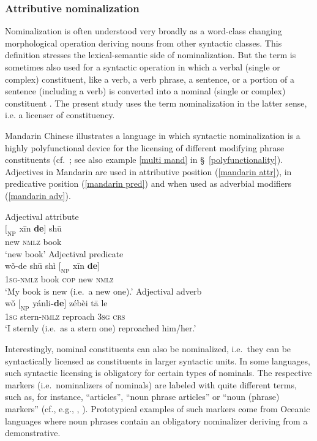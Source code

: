 \subsubsection{Attributive nominalization} \label{attr nmlz}
Nominalization is often understood very broadly as a word-class changing morphological operation deriving nouns from other syntactic classes. This definition stresses the lexical-semantic side of nominalization. But the term is sometimes also used for a syntactic operation in which a verbal (single or complex) constituent, like a verb, a verb phrase, a sentence, or a portion of a sentence (including a verb) is converted into a nominal (single or complex) constituent \citep[575]{li-etal1981}. The present study uses the term nominalization in the latter sense, i.e. a licenser of constituency.

Mandarin Chinese illustrates a language in which syntactic nominalization is a highly polyfunctional device for the licensing of different modifying phrase constituents (cf.~\citealt[575–593]{li-etal1981}; see also example \ref{multi mand} in \S~\ref{polyfunctionality}). Adjectives in Mandarin are used in attributive position (\ref{mandarin attr}), in predicative position (\ref{mandarin pred}) and when used as adverbial modifiers (\ref{mandarin adv}).%
\begin{exe}
\ex
{}
\begin{xlist}
\ex	\rm{Adjectival attribute}\\
\gll	$[_\textrm{NP}$ xīn 		\textbf{de}$]$ 	shū\\
	{} new	 	\textsc{nmlz} 	book\\
\glt	‘new book’\label{mandarin attr}
\ex	\rm{Adjectival predicate}\\
\gll	wǒ-de shū shì $[_\textrm{NP}$ xīn \textbf{de}$]$\\
	\textsc{1sg-nmlz} book \textsc{cop} {} new \textsc{nmlz}\\
\glt	‘My book is new (i.e.~a new one).’\label{mandarin pred}
\ex	\rm{Adjectival adverb}\\
\gll	wǒ $[_\textrm{NP}$ yánli\textbf{-de}$]$ zébèi tā le\\
	\textsc{1sg} {} stern\textsc{-nmlz} reproach \textsc{3sg} \textsc{crs}\\
\glt	‘I sternly (i.e.~as a stern one) reproached him/her.’ \label{mandarin adv}
\end{xlist}
\end{exe}
Interestingly, nominal constituents can also be nominalized, i.e.~they can be syntactically licensed as constituents in larger syntactic units. In some languages, such syntactic licensing is obligatory for certain types of nominals. The respective markers (i.e.~nominalizers of nominals) are labeled with quite different terms, such as, for instance, “articles”, “noun phrase articles” or “noun (phrase) markers” (cf., e.g., \citealt[152]{dryer2007}, \citealt[95, elsewhere]{rijkhoff2002}). Prototypical examples of such markers come from Oceanic languages where noun phrases contain an obligatory nominalizer deriving from a demonstrative. 

